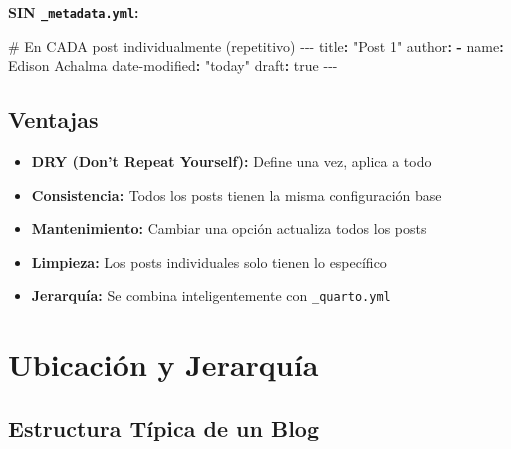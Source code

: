 \documentclass[
  doc,
  floatsintext,
  longtable,
  a4paper,
  nolmodern,
  notxfonts,
  notimes,
  12pt,
  colorlinks=true,linkcolor=blue,citecolor=blue,urlcolor=blue]{apa7}
\newenvironment{Shaded}{\begin{snugshade}}{\end{snugshade}}
\newcommand{\AttributeTok}[1]{\textcolor[rgb]{0.40,0.45,0.13}{#1}}
\newcommand{\CharTok}[1]{\textcolor[rgb]{0.13,0.47,0.30}{#1}}
\newcommand{\CommentTok}[1]{\textcolor[rgb]{0.37,0.37,0.37}{#1}}
\newcommand{\FunctionTok}[1]{\textcolor[rgb]{0.28,0.35,0.67}{#1}}
\newcommand{\KeywordTok}[1]{\textcolor[rgb]{0.00,0.23,0.31}{\textbf{#1}}}
\newcommand{\PreprocessorTok}[1]{\textcolor[rgb]{0.68,0.00,0.00}{#1}}
\newcommand{\StringTok}[1]{\textcolor[rgb]{0.13,0.47,0.30}{#1}}
\providecommand{\tightlist}{%
  \setlength{\itemsep}{0pt}\setlength{\parskip}{0pt}}
\begin{document}
\textbf{SIN \texttt{\_metadata.yml}:}

\begin{Shaded}
\begin{Highlighting}[]
\CommentTok{\# En CADA post individualmente (repetitivo)}
\PreprocessorTok{{-}{-}{-}}
\FunctionTok{title}\KeywordTok{:}\AttributeTok{ }\StringTok{"Post 1"}
\FunctionTok{author}\KeywordTok{:}
\AttributeTok{  }\KeywordTok{{-}}\AttributeTok{ }\FunctionTok{name}\KeywordTok{:}\AttributeTok{ Edison Achalma}
\FunctionTok{date{-}modified}\KeywordTok{:}\AttributeTok{ }\StringTok{"today"}
\FunctionTok{draft}\KeywordTok{:}\AttributeTok{ }\CharTok{true}
\PreprocessorTok{{-}{-}{-}}
\end{Highlighting}
\end{Shaded}

\subsection{Ventajas}\label{ventajas}

\begin{itemize}
\tightlist
\item
  \textbf{DRY (Don't Repeat Yourself):} Define una vez, aplica a todo
\item
  \textbf{Consistencia:} Todos los posts tienen la misma configuración
  base
\item
  \textbf{Mantenimiento:} Cambiar una opción actualiza todos los posts
\item
  \textbf{Limpieza:} Los posts individuales solo tienen lo específico
\item
  \textbf{Jerarquía:} Se combina inteligentemente con
  \texttt{\_quarto.yml}
\end{itemize}

\section{Ubicación y Jerarquía}\label{ubicaciuxf3n-y-jerarquuxeda}

\subsection{Estructura Típica de un
Blog}\label{estructura-tuxedpica-de-un-blog}
\end{document}
